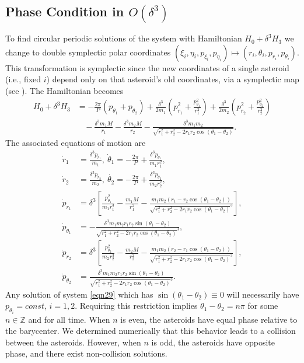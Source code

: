 \documentclass[12pt]{article}
\newcommand{\Int}{\mathbb{Z}}
\begin{document}
\subsection{Phase Condition in $O(\delta^3)$}
To find circular periodic solutions of the system with Hamiltonian $H_0 + \delta^3H_3$ we change to double symplectic polar coordinates $(\xi_i, \eta_i, p_{\xi_i}, p_{\eta_i}) \mapsto (r_i, \theta_i, p_{r_i}, p_{\theta_i})$. This transformation is symplectic since the new coordinates of a single asteroid (i.e., fixed $i$) depend only on that asteroid's old coordinates, via a symplectic map (see \cite{meyerOffin}).
The Hamiltonian becomes
\begin{align}
H_0 + \delta^3H_3 & = -\frac{2\pi}{P}\left(p_{\theta_1} + p_{\theta_2}\right) + \frac{\delta^3}{2m_1}\left(p_{r_1}^2 + \frac{p_{\theta_1}^2}{r_1^2}\right) + \frac{\delta^3}{2m_2}\left(p_{r_2}^2 + \frac{p_{\theta_2}^2}{r_2^2}\right) \nonumber\\
& \ \ \ \ - \frac{\delta^3m_1M}{r_1} -\frac{\delta^3m_2M}{r_2} - \frac{\delta^3m_1m_2}{\sqrt{r_1^2 + r_2^2 - 2r_1r_2\cos(\theta_1 - \theta_2)}}.
\end{align}
The associated equations of motion are
\begin{equation}
\begin{aligned}
\dot{r}_1 & = \frac{\delta^3p_{r_1}}{m_1},\ \dot{\theta}_1 = -\frac{2\pi}{P} + \frac{\delta^3p_{\theta_1}}{m_1 r_1^2}, \\
\dot{r}_2  & = \frac{\delta^3p_{r_2}}{m_2},\ \dot{\theta_2} = -\frac{2\pi}{P} + \frac{\delta^3p_{\theta_2}}{m_2 r_2^2}, \\
\dot{p}_{r_1} & = \delta^3\left[\frac{p_{\theta_1}^2}{m_1 r_1^3} - \frac{m_1 M}{r_1^2} - \frac{m_1m_2(r_1 - r_2\cos(\theta_1 - \theta_2))}{\sqrt{r_1^2 + r_2^2 - 2r_1r_2\cos(\theta_1 - \theta_2)}^3}\right], \\
\dot{p}_{\theta_1} & = -\frac{\delta^3m_1m_2r_1r_2\sin(\theta_1 - \theta_2)}{\sqrt{r_1^2 + r_2^2 - 2r_1r_2\cos(\theta_1 - \theta_2)}^3}, \\
\dot{p}_{r_2} & = \delta^3\left[\frac{p_{\theta_2}^2}{m_2 r_2^3} - \frac{m_2 M}{r_2^2} - \frac{m_1m_2(r_2 - r_1\cos(\theta_1 - \theta_2))}{\sqrt{r_1^2 + r_2^2 - 2r_1r_2\cos(\theta_1 - \theta_2)}^3}\right], \\
\dot{p}_{\theta_2} & = \frac{\delta^3m_1m_2r_1r_2\sin(\theta_1 - \theta_2)}{\sqrt{r_1^2 + r_2^2 - 2r_1r_2\cos(\theta_1 - \theta_2)}^3}.
\label{eqn29}
\end{aligned}
\end{equation}
Any solution of system \eqref{eqn29} which has $\sin(\theta_1 - \theta_2) \equiv 0$ will necessarily have $p_{\theta_i} = const$, $i=1,2$. Requiring this restriction implies $\theta_1 - \theta_2 = n\pi$ for some $n \in \Int$ and for all time. When $n$ is even, the asteroids have equal phase relative to the barycenter. We determined numerically that this behavior leads to a collision between the asteroids. However, when $n$ is odd, the asteroids have opposite phase, and there exist non-collision solutions.
\end{document}

